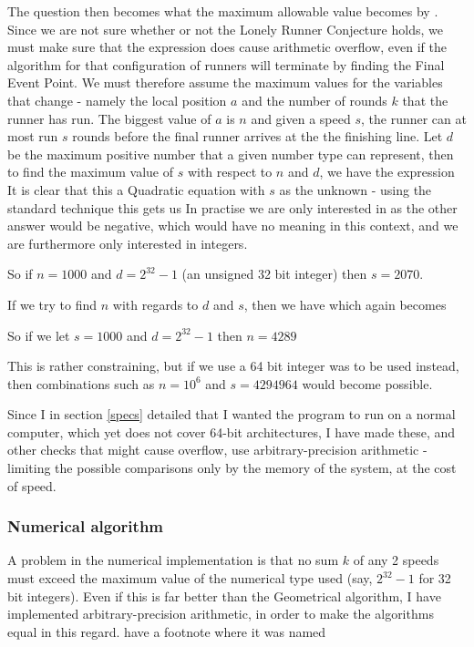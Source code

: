 {The question then becomes what the maximum allowable value becomes by . Since we are not sure whether or not the Lonely Runner Conjecture holds, we must make sure that the expression does cause arithmetic overflow, even if the algorithm for that configuration of runners will terminate by finding the Final Event Point. We must therefore assume the maximum values for the variables that change - namely the local position $a$ and the number of rounds $k$ that the runner has run. The biggest value of $a$ is $n$ and given a speed $s$, the runner can at most run $s$ rounds before the final runner arrives at the the finishing line. Let $d$ be the maximum positive number that a given number type can represent, then to find the maximum value of $s$ with respect to $n$ and $d$, we have the expression 
It is clear that this a Quadratic equation with $s$ as the unknown - using the standard technique this gets us
In practise we are only interested in
as the other answer would be negative, which would have no meaning in this context, and we are furthermore only interested in integers.

So if $n = 1000$ and $d = 2^{32}-1$ (an unsigned 32 bit integer) then $s = 2070$.

If we try to find $n$ with regards to $d$ and $s$, then we have
which again becomes

So if we let $s = 1000$ and $d = 2^{32}-1$ then $n = 4289$

This is rather constraining, but if we use a 64 bit integer was to be used instead, then combinations such as $n = 10^6$ and $s = 4294964$ would become possible.

Since I in section \ref{specs} detailed that I wanted the program to run on a normal computer, which yet does not cover 64-bit architectures, I have made these, and other checks that might cause overflow, use arbitrary-precision arithmetic - limiting the possible comparisons only by the memory of the system, at the cost of speed.

\subsubsection{Numerical algorithm}
A problem in the numerical implementation is that no sum $k$ of any 2 speeds must exceed the maximum value of the numerical type used (say, $2^{32} - 1$ for 32 bit integers). Even if this is far better than the Geometrical algorithm, I have implemented arbitrary-precision arithmetic, in order to make the algorithms equal in this regard.
have a footnote where it was named}

